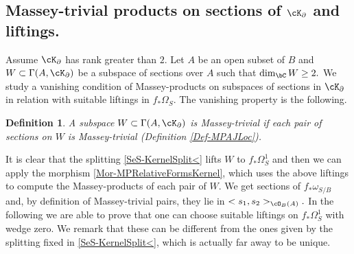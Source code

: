 \documentclass[a4paper,11pt]{amsart}
\newtheorem{definition}[theorem]{Definition}
\begin{document}
{         	\subsection{Massey-trivial products on sections of $\cK_\partial$ and liftings.}
         	Assume $\cK_\partial$ has rank greater than $2.$ Let $A$ be an open subset of $B$ and $W\subset\Gamma(A,\cK_\partial )$ be a subspace of sections over $A$ such that $\dim_\bC W\geq 2.$ We study a vanishing condition of Massey-products on subspaces of sections in $\cK_\partial$ in relation with suitable liftings in $f_*\Omega_S.$ The vanishing property is the following.
   	       	 \begin{definition} \label{Def-MTSubspSec}A subspace $W\subset\Gamma(A,\cK_\partial )$ is {\em Massey-trivial } if each pair of sections on $W$ is Massey-trivial (Definition \ref{Def-MPAJLoc}).
         	 \end{definition}
         	 It is clear that the splitting \eqref{SeS-KernelSplit<} lifts $W$ to $f_*\Omega^1_S$ and then we can apply the morphism \eqref{Mor-MPRelativeFormsKernel}, which uses the above liftings to compute the Massey-products of each pair of $W.$ We get sections of $f_*\omega_{S/B}$ and, by definition of Massey-trivial pairs, they lie in $<s_1,s_2>_{\cO_B(A)}.$ In the following we are able to prove that one can choose suitable liftings on $f_*\Omega^1_S$ with wedge zero. We remark that these can be different from the ones given by the splitting fixed  in \eqref{SeS-KernelSplit<}, which is actually far away to be unique.
         	 
}
\end{document}
